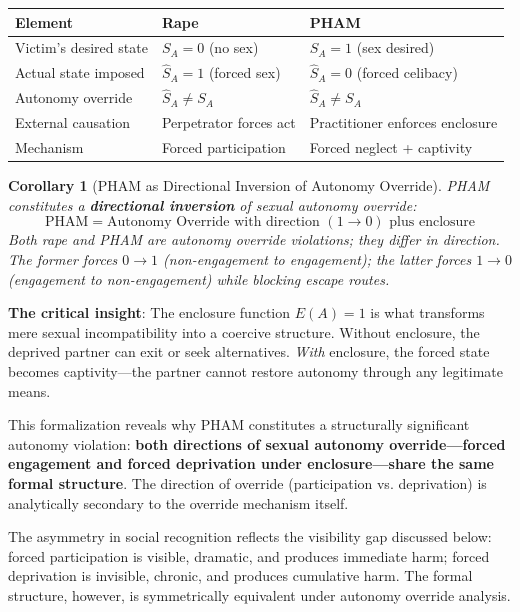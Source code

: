 \documentclass[12pt, letterpaper]{article}
\newtheorem{corollary}{Corollary}[section]
\begin{document}
\begin{center}
\begin{tabular}{|p{1.8in}|p{2.2in}|p{2.2in}|}
\hline
\textbf{Element} & \textbf{Rape} & \textbf{PHAM} \\
\hline
Victim's desired state & $S_A = 0$ (no sex) & $S_A = 1$ (sex desired) \\
\hline
Actual state imposed & $\hat{S}_A = 1$ (forced sex) & $\hat{S}_A = 0$ (forced celibacy) \\
\hline
Autonomy override & $\hat{S}_A \neq S_A$ & $\hat{S}_A \neq S_A$ \\
\hline
External causation & Perpetrator forces act & Practitioner enforces enclosure \\
\hline
Mechanism & Forced participation & Forced neglect + captivity \\
\hline
\end{tabular}
\end{center}

\begin{corollary}[PHAM as Directional Inversion of Autonomy Override]
PHAM constitutes a \textbf{directional inversion} of sexual autonomy override:
\[
\text{PHAM} = \text{Autonomy Override with direction } (1 \rightarrow 0) \text{ plus enclosure}
\]
Both rape and PHAM are autonomy override violations; they differ in direction. The former forces $0 \rightarrow 1$ (non-engagement to engagement); the latter forces $1 \rightarrow 0$ (engagement to non-engagement) while blocking escape routes.
\end{corollary}

\textbf{The critical insight}: The enclosure function $E(A) = 1$ is what transforms mere sexual incompatibility into a coercive structure. Without enclosure, the deprived partner can exit or seek alternatives. \textit{With} enclosure, the forced state becomes captivity---the partner cannot restore autonomy through any legitimate means.

This formalization reveals why PHAM constitutes a structurally significant autonomy violation: \textbf{both directions of sexual autonomy override---forced engagement and forced deprivation under enclosure---share the same formal structure}. The direction of override (participation vs. deprivation) is analytically secondary to the override mechanism itself.

The asymmetry in social recognition reflects the visibility gap discussed below: forced participation is visible, dramatic, and produces immediate harm; forced deprivation is invisible, chronic, and produces cumulative harm. The formal structure, however, is symmetrically equivalent under autonomy override analysis.
\end{document}
